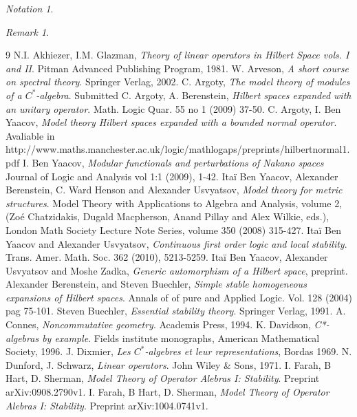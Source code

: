 \documentclass{amsart}
\theoremstyle{definition}
\theoremstyle{remark}
\newtheorem{rem}[theo]{Remark}
\newtheorem{nota}[theo]{Notation}
\begin{document}
\begin{nota}
\begin{rem}
\begin{thebibliography}{9}
 N.I. Akhiezer, I.M. Glazman, \textit{Theory of linear operators in Hilbert Space vols. I and II}. Pitman Advanced Publishing Program, 1981.
 W. Arveson, \textit{A short course on spectral theory}. Springer Verlag, 2002.
C. Argoty, \textit{The model theory of modules of a $C^*$-algebra}. Submitted
C. Argoty, A. Berenstein, \textit{Hilbert spaces expanded with an unitary operator}. Math. Logic Quar. 55 no 1 (2009) 37-50.
C. Argoty, I. Ben Yaacov, \textit{Model theory Hilbert spaces expanded with a bounded normal operator}. Avaliable in http://www.maths.manchester.ac.uk/logic/mathlogaps/preprints/hilbertnormal1.pdf
 I. Ben Yaacov, \textit{Modular functionals and perturbations of Nakano spaces} Journal of Logic and Analysis vol 1:1 (2009), 1-42. 
 Ita\"i Ben Yaacov, Alexander Berenstein, C. Ward Henson and Alexander Usvyatsov, \textit{Model theory for metric structures}. Model Theory with Applications to Algebra and Analysis, volume 2, (Zo\'e Chatzidakis, Dugald Macpherson, Anand Pillay and Alex Wilkie, eds.), London Math Society Lecture Note Series, volume 350 (2008) 315-427.
 Ita\"i Ben Yaacov and Alexander Usvyatsov, \textit{Continuous first order logic and local stability}. Trans. Amer. Math. Soc. 362 (2010), 5213-5259.
 Ita\"i Ben Yaacov, Alexander Usvyatsov and Moshe Zadka, \textit{Generic automorphism of a Hilbert space}, preprint.
 Alexander Berenstein, and Steven Buechler, \textit{Simple stable homogeneous expansions of Hilbert spaces}. Annals of of pure and Applied Logic. Vol. 128 (2004) pag 75-101.
 Steven Buechler, \textit{Essential stability theory}. Springer Verlag, 1991.
A. Connes, \textit{Noncommutative geometry}. Academis Press, 1994.
K. Davidson, \textit{C*-algebras by example}. Fields institute monographs, American Mathematical Society, 1996.
 J. Dixmier, \textit{Les $C^*$-algebres et leur representations}, Bordas 1969.
 N. Dunford, J. Schwarz, \textit{Linear operators}. John Wiley \& Sons, 1971.
 I. Farah, B Hart, D. Sherman, \textit{Model Theory of Operator Alebras I: Stability}. Preprint arXiv:0908.2790v1.
 I. Farah, B Hart, D. Sherman, \textit{Model Theory of Operator Alebras I: Stability}. Preprint arXiv:1004.0741v1.

\end{thebibliography}
\end{rem}
\end{nota}
\end{document}
